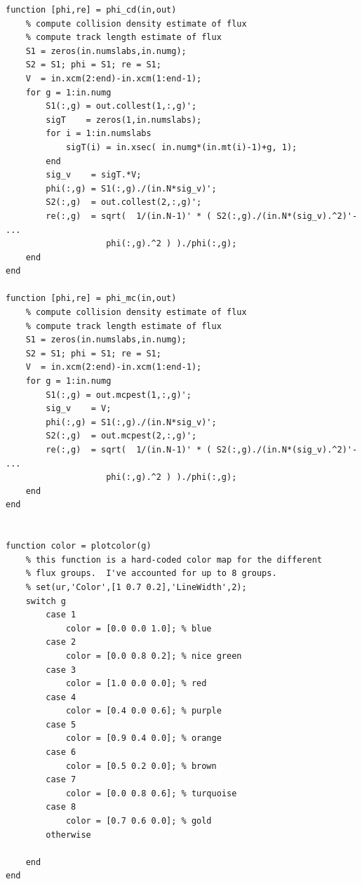 \documentclass[letter,11pt]{article}
\begin{document}
{\begin{verbatim}
function [phi,re] = phi_cd(in,out)
    % compute collision density estimate of flux
    % compute track length estimate of flux
    S1 = zeros(in.numslabs,in.numg);
    S2 = S1; phi = S1; re = S1;
    V  = in.xcm(2:end)-in.xcm(1:end-1);    
    for g = 1:in.numg
        S1(:,g) = out.collest(1,:,g)';
        sigT    = zeros(1,in.numslabs);
        for i = 1:in.numslabs
            sigT(i) = in.xsec( in.numg*(in.mt(i)-1)+g, 1);
        end
        sig_v    = sigT.*V;
        phi(:,g) = S1(:,g)./(in.N*sig_v)';
        S2(:,g)  = out.collest(2,:,g)';
        re(:,g)  = sqrt(  1/(in.N-1)' * ( S2(:,g)./(in.N*(sig_v).^2)'- ...
                    phi(:,g).^2 ) )./phi(:,g);
    end
end

function [phi,re] = phi_mc(in,out)
    % compute collision density estimate of flux
    % compute track length estimate of flux
    S1 = zeros(in.numslabs,in.numg);
    S2 = S1; phi = S1; re = S1;
    V  = in.xcm(2:end)-in.xcm(1:end-1);    
    for g = 1:in.numg
        S1(:,g) = out.mcpest(1,:,g)';
        sig_v    = V;
        phi(:,g) = S1(:,g)./(in.N*sig_v)';
        S2(:,g)  = out.mcpest(2,:,g)';
        re(:,g)  = sqrt(  1/(in.N-1)' * ( S2(:,g)./(in.N*(sig_v).^2)'- ...
                    phi(:,g).^2 ) )./phi(:,g);
    end
end


function color = plotcolor(g)
    % this function is a hard-coded color map for the different
    % flux groups.  I've accounted for up to 8 groups.
    % set(ur,'Color',[1 0.7 0.2],'LineWidth',2);
    switch g
        case 1
            color = [0.0 0.0 1.0]; % blue
        case 2
            color = [0.0 0.8 0.2]; % nice green
        case 3
            color = [1.0 0.0 0.0]; % red
        case 4
            color = [0.4 0.0 0.6]; % purple
        case 5
            color = [0.9 0.4 0.0]; % orange
        case 6
            color = [0.5 0.2 0.0]; % brown
        case 7
            color = [0.0 0.8 0.6]; % turquoise
        case 8
            color = [0.7 0.6 0.0]; % gold
        otherwise
            
    end
end 

\end{verbatim}
}
\end{document}
